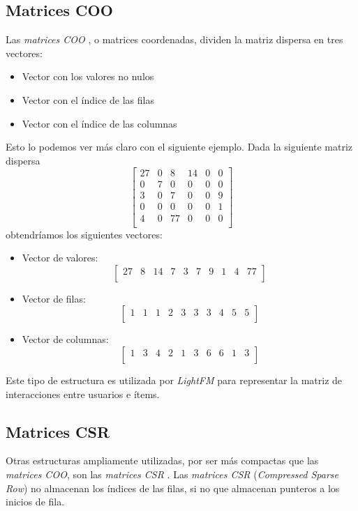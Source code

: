 \subsection{Matrices COO}\label{matrices-coo}
Las \textit{matrices COO} \cite{coo-matrix}, o matrices coordenadas, dividen la matriz dispersa en tres vectores:
\begin{itemize}
\tightlist
\item Vector con los valores no nulos
\item Vector con el índice de las filas
\item Vector con el índice de las columnas
\end{itemize}
Esto lo podemos ver más claro con el siguiente ejemplo. Dada la siguiente matriz dispersa
\[\begin{bmatrix}
27&0&8&14&0&0\\
0&7&0&0&0&0\\
3&0&7&0&0&9\\
0&0&0&0&0&1\\
4&0&77&0&0&0\\
\end{bmatrix}\]
obtendríamos los siguientes vectores:
\begin{itemize}
\tightlist
\item Vector de valores: \[\begin{bmatrix} 27&8&14&7&3&7&9&1&4&77\\\end{bmatrix}\]
\item Vector de filas: \[\begin{bmatrix} 1&1&1&2&3&3&3&4&5&5\\\end{bmatrix}\]
\item Vector de columnas: \[\begin{bmatrix} 1&3&4&2&1&3&6&6&1&3\\
\end{bmatrix}\]
\end{itemize}

Este tipo de estructura es utilizada por \textit{LightFM} para representar la matriz de interacciones entre usuarios e ítems.

\subsection{Matrices CSR}\label{matrices-csr}
Otras estructuras ampliamente utilizadas, por ser más compactas que las \textit{matrices COO}, son las \textit{matrices CSR} \cite{csr-matrix}. Las \textit{matrices CSR} (\textit{Compressed Sparse Row}) no almacenan los índices de las filas, si no que almacenan punteros a los inicios de fila.

